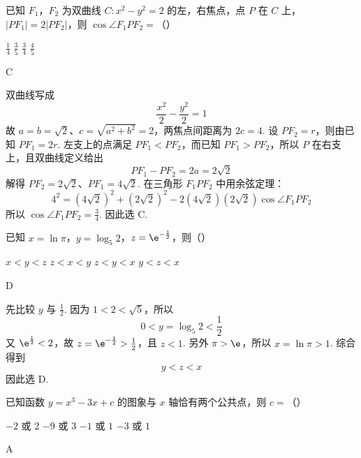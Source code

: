\begin{problem}
已知 \(F_{1}\)，\(F_{2}\) 为双曲线 \(C: x^{2} - y^{2} = 2\) 的左，右焦点，点 \(P\) 在 \(C\) 上，\(|PF_{1}| = 2|PF_{2}|\)，则 \(\cos \angle F_{1}PF_{2} =\)（\quad）

\choices
    {\(\frac{1}{4}\)}
    {\(\frac{3}{5}\)}
    {\(\frac{3}{4}\)}
    {\(\frac{4}{5}\)}
\end{problem}

\begin{answer}
C
\end{answer}

\begin{solution}
双曲线写成
\[
\frac{x^2}{2}-\frac{y^2}{2}=1
\]
故 \(a=b=\sqrt2\)、\(c=\sqrt{a^2+b^2}=2\)，两焦点间距离为 \(2c=4\). 设 \(PF_2=r\)，则由已知 \(PF_1=2r\). 左支上的点满足 \(PF_1<PF_2\)，而已知 \(PF_1>PF_2\)，所以 \(P\) 在右支上，且双曲线定义给出
\[
PF_1-PF_2=2a=2\sqrt2
\]
解得 \(PF_2=2\sqrt2\)、\(PF_1=4\sqrt2\). 在三角形 \(F_1PF_2\) 中用余弦定理：
\[
4^2=(4\sqrt2)^2+(2\sqrt2)^2
-2(4\sqrt2)(2\sqrt2)\cos\angle F_1PF_2
\]
所以 \(\cos\angle F_1PF_2=\frac34\). 因此选 C.
\end{solution}

\begin{problem}
已知 \(x = \ln \pi\)，\(y = \log_5 2\)，\(z = \e^{-\frac{1}{2}}\)，则（\quad）

\choices
    {\(x < y < z\)}
    {\(z < x < y\)}
    {\(z < y < x\)}
    {\(y < z < x\)}
\end{problem}

\begin{answer}
D
\end{answer}

\begin{solution}
先比较 \(y\) 与 \(\frac{1}{2}\). 因为 \(1<2<\sqrt5\)，所以
\[
0<y=\log_5 2<\frac12
\]
又 \(\e^{\frac{1}{2}}<2\)，故 \(z=\e^{-\frac{1}{2}}>\frac{1}{2}\)，且 \(z<1\). 另外 \(\pi>\e\)，所以 \(x=\ln\pi>1\). 综合得到
\[
y<z<x
\]
因此选 D.
\end{solution}

\begin{problem}
已知函数 \( y = x^3 - 3x + c \) 的图象与 \( x \) 轴恰有两个公共点，则 \( c = \)（\quad）

\choices
    {\(-2\) 或 \(2\)}
    {\(-9\) 或 \(3\)}
    {\(-1\) 或 \(1\)}
    {\(-3\) 或 \(1\)}
\end{problem}

\begin{answer}
A
\end{answer}

